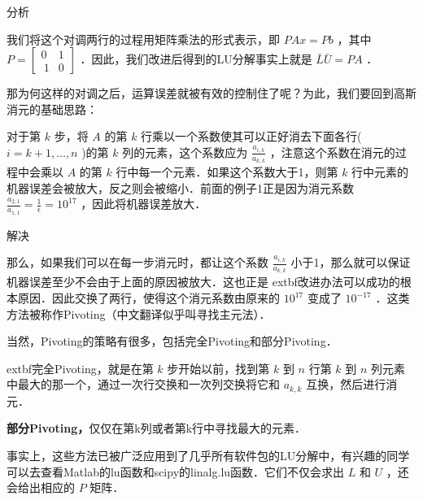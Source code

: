 分析

我们将这个对调两行的过程用矩阵乘法的形式表示，即  $PAx=Pb$  ，其中  $P=\begin{bmatrix} 0&1\\\ 1&0 \end{bmatrix}$  ．因此，我们改进后得到的LU分解事实上就是  $\bar{L}\bar{U}=PA$  ．

那为何这样的对调之后，运算误差就被有效的控制住了呢？为此，我们要回到高斯消元的基础思路：

对于第  $k$  步，将 $A$  的第  $k$  行乘以一个系数使其可以正好消去下面各行(  $i=k+1,...,n$  )的第  $k$  列的元素，这个系数应为  $\frac{a_{i,k}}{a_{k,k}}$  ，注意这个系数在消元的过程中会乘以  $A$  的第  $k $  行中每一个元素．如果这个系数大于1，则第  $k $  行中元素的机器误差会被放大，反之则会被缩小．前面的例子1正是因为消元系数  $\frac{a_{2,1}}{a_{1,1}}=\frac{1}{\epsilon}=10^{17}$  ，因此将机器误差放大．

解决

那么，如果我们可以在每一步消元时，都让这个系数  $\frac{a_{i,k}}{a_{k,k}}$ 小于1，那么就可以保证机器误差至少不会由于上面的原因被放大．这也正是	extbf{改进}办法可以成功的根本原因．因此交换了两行，使得这个消元系数由原来的  $10^{17}$  变成了  $10^{-17}$  ．这类方法被称作Pivoting（中文翻译似乎叫寻找主元法）．

当然，Pivoting的策略有很多，包括完全Pivoting和部分Pivoting．

	extbf{完全Pivoting}，就是在第  $k$ 步开始以前，找到第  $k$  到  $n$  行第  $k$  到  $n$  列元素中最大的那一个，通过一次行交换和一次列交换将它和  $a_{k,k}$  互换，然后进行消元．

\textbf{部分Pivoting，}仅仅在第k列或者第k行中寻找最大的元素．

事实上，这些方法已被广泛应用到了几乎所有软件包的LU分解中，有兴趣的同学可以去查看Matlab的lu函数和scipy的linalg.lu函数．它们不仅会求出  $L$  和  $U$  ，还会给出相应的  $P$  矩阵．
